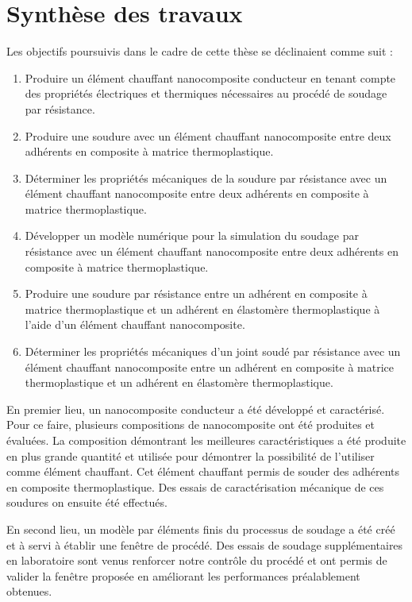 \label{sec:Contributions}

\section{Synthèse des travaux}

Les objectifs poursuivis dans le cadre de cette thèse se déclinaient comme suit : 

\begin{enumerate}
	\item Produire un élément chauffant nanocomposite conducteur en tenant compte des propriétés électriques et thermiques nécessaires au procédé de soudage par résistance. 
	\item Produire une soudure avec un élément chauffant nanocomposite entre deux adhérents en composite à matrice thermoplastique. 
	\item Déterminer les propriétés mécaniques de la soudure par résistance avec un élément chauffant nanocomposite entre deux adhérents en composite à matrice thermoplastique. 
	\item Développer un modèle numérique pour la simulation du soudage par résistance avec un élément chauffant nanocomposite entre deux adhérents en composite à matrice thermoplastique. 
	\item Produire une soudure par résistance entre un adhérent en composite à matrice thermoplastique et un adhérent en élastomère thermoplastique à l'aide d'un élément chauffant nanocomposite. 
	\item Déterminer les propriétés mécaniques d'un joint soudé par résistance avec un élément chauffant nanocomposite entre un adhérent en composite à matrice thermoplastique et un adhérent en élastomère thermoplastique. 
\end{enumerate}

En premier lieu, un nanocomposite conducteur a été développé et caractérisé. 
Pour ce faire, plusieurs compositions de nanocomposite ont été produites et évaluées. 
La composition démontrant les meilleures caractéristiques a été produite en plus grande quantité et utilisée pour démontrer la possibilité de l'utiliser comme élément chauffant. 
Cet élément chauffant permis de souder des adhérents en composite thermoplastique. 
Des essais de caractérisation mécanique de ces soudures on ensuite été effectués. 

En second lieu, un modèle par éléments finis du processus de soudage a été créé et à servi à établir une fenêtre de procédé. 
Des essais de soudage supplémentaires en laboratoire sont venus renforcer notre contrôle du procédé et ont permis de valider la fenêtre proposée en améliorant les performances préalablement obtenues. 

